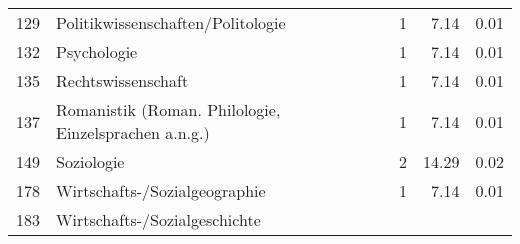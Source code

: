 \begin{longtable}{lXrrr}
     129 &
     \multicolumn{1}{X}{ Politikwissenschaften/Politologie   } &


       \num{1} &
       \num[round-mode=places,round-precision=2]{7,14} &
         \num[round-mode=places,round-precision=2]{0,01} \\

     132 &
     \multicolumn{1}{X}{ Psychologie   } &


       \num{1} &
       \num[round-mode=places,round-precision=2]{7,14} &
         \num[round-mode=places,round-precision=2]{0,01} \\

     135 &
     \multicolumn{1}{X}{ Rechtswissenschaft   } &


       \num{1} &
       \num[round-mode=places,round-precision=2]{7,14} &
         \num[round-mode=places,round-precision=2]{0,01} \\

     137 &
     \multicolumn{1}{X}{ Romanistik (Roman. Philologie, Einzelsprachen a.n.g.)   } &


       \num{1} &
       \num[round-mode=places,round-precision=2]{7,14} &
         \num[round-mode=places,round-precision=2]{0,01} \\

     149 &
     \multicolumn{1}{X}{ Soziologie   } &


       \num{2} &
       \num[round-mode=places,round-precision=2]{14,29} &
         \num[round-mode=places,round-precision=2]{0,02} \\

     178 &
     \multicolumn{1}{X}{ Wirtschafts-/Sozialgeographie   } &


       \num{1} &
       \num[round-mode=places,round-precision=2]{7,14} &
         \num[round-mode=places,round-precision=2]{0,01} \\

     183 &
     \multicolumn{1}{X}{ Wirtschafts-/Sozialgeschichte   } &



\end{longtable}
